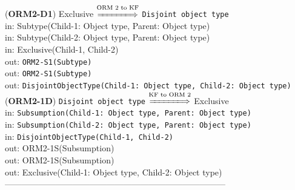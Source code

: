 \documentclass[sn-mathphys]{sn-jnl}
\begin{document}
{{{{({\bf ORM2-D1}) {Exclusive} $\overset{\text{ORM 2 to KF}}{\xLongrightarrow{\hspace*{1.4cm}}}$ {\tt Disjoint object type}\\
\hspace*{0.3cm}in: {Subtype(Child-1: Object type, Parent: Object type)} \\
\hspace*{0.3cm}in: {Subtype(Child-2: Object type, Parent: Object type)} \\
\hspace*{0.3cm}in: {Exclusive(Child-1, Child-2)} \\
\hspace*{0.5cm}out:  {\tt ORM2-S1(Subtype)}\\
\hspace*{0.5cm}out:  {\tt ORM2-S1(Subtype)}\\
\hspace*{0.5cm}out:  {\tt DisjointObjectType(Child-1: Object type, Child-2: Object type)}\\

({\bf ORM2-1D}) {\tt Disjoint object type} $\overset{\text{KF to ORM 2}}{\xLongrightarrow{\hspace*{1.4cm}}}$ {Exclusive}\\
\hspace*{0.3cm}in: {\tt Subsumption(Child-1: Object type, Parent: Object type)} \\
\hspace*{0.3cm}in: {\tt Subsumption(Child-2: Object type, Parent: Object type)} \\
\hspace*{0.3cm}in: {\tt DisjointObjectType(Child-1, Child-2)} \\
\hspace*{0.5cm}out:  {ORM2-1S(Subsumption)}\\
\hspace*{0.5cm}out:  {ORM2-1S(Subsumption)}\\
\hspace*{0.5cm}out:  {Exclusive(Child-1: Object type, Child-2: Object type)}\\

------------------------------------------------------------------------------
\\ \

}}}}
\end{document}
